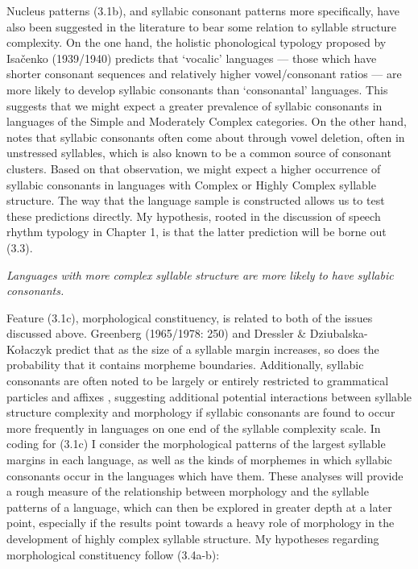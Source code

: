   Nucleus patterns (3.1b), and syllabic consonant patterns more specifically, have also been suggested in the literature to bear some relation to syllable structure complexity. On the one hand, the holistic phonological typology proposed by Isačenko (1939/1940) predicts that ‘vocalic’ languages — those which have shorter consonant sequences and relatively higher vowel/consonant ratios — are more likely to develop syllabic consonants than ‘consonantal’ languages. This suggests that we might expect a greater prevalence of syllabic consonants in languages of the Simple and Moderately Complex categories. On the other hand, \citet{Bell1978a} notes that syllabic consonants often come about through vowel deletion, often in unstressed syllables, which is also known to be a common source of consonant clusters. Based on that observation, we might expect a higher occurrence of syllabic consonants in languages with Complex or Highly Complex syllable structure. The way that the language sample is constructed allows us to test these predictions directly. My hypothesis, rooted in the discussion of speech rhythm typology in Chapter 1, is that the latter prediction will be borne out (3.3).

\ea\label{ex:(3.3)}
   \textit{Languages} \textit{with} \textit{more} \textit{complex} \textit{syllable} \textit{structure} \textit{are} \textit{more} \textit{likely} \textit{to} \textit{have} \textit{syllabic} \textit{consonants.}
\z

  Feature (3.1c), morphological constituency, is related to both of the issues discussed above. Greenberg (1965/1978: 250) and Dressler \& Dziubalska-Kołaczyk  predict that as the size of a syllable margin increases, so does the probability that it contains morpheme boundaries. Additionally, syllabic consonants are often noted to be largely or entirely restricted to grammatical particles and affixes \citep[159]{Bell1978a}, suggesting additional potential interactions between syllable structure complexity and morphology if syllabic consonants are found to occur more frequently in languages on one end of the syllable complexity scale. In coding for (3.1c) I consider the morphological patterns of the largest syllable margins in each language, as well as the kinds of morphemes in which syllabic consonants occur in the languages which have them. These analyses will provide a rough measure of the relationship between morphology and the syllable patterns of a language, which can then be explored in greater depth at a later point, especially if the results point towards a heavy role of morphology in the development of highly complex syllable structure. My hypotheses regarding morphological constituency follow (3.4a-b):

